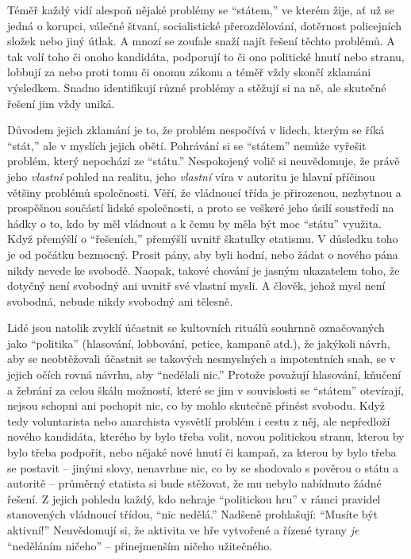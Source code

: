 \documentclass{book}
\begin{document}
Téměř každý vidí alespoň nějaké problémy se \enquote{státem,} ve kterém žije, ať už se jedná o korupci, válečné štvaní, socialistické přerozdělování, dotěrnost policejních složek nebo jiný útlak. A mnozí se zoufale snaží najít řešení těchto problémů. A tak volí toho či onoho kandidáta, podporují to či ono politické hnutí nebo stranu, lobbují za nebo proti tomu či onomu zákonu a téměř vždy skončí zklamáni výsledkem. Snadno identifikují různé problémy a stěžují si na ně, ale skutečné řešení jim vždy uniká.

Důvodem jejich zklamání je to, že problém nespočívá v lidech, kterým se říká \enquote{stát,} ale v myslích jejich obětí. Pohrávání si se \enquote{státem} nemůže vyřešit problém, který nepochází ze \enquote{státu.} Nespokojený volič si neuvědomuje, že právě jeho \emph{vlastní} pohled na realitu, jeho \emph{vlastní} víra v autoritu je hlavní příčinou většiny problémů společnosti. Věří, že vládnoucí třída je přirozenou, nezbytnou a prospěšnou součástí lidské společnosti, a proto se veškeré jeho úsilí soustředí na hádky o to, kdo by měl vládnout a k čemu by měla být moc \enquote{státu} využita. Když přemýšlí o \enquote{řešeních,} přemýšlí uvnitř škatulky etatismu. V důsledku toho je od počátku bezmocný. Prosit pány, aby byli hodní, nebo žádat o nového pána nikdy nevede ke svobodě. Naopak, takové chování je jasným ukazatelem toho, že dotyčný není svobodný ani uvnitř své vlastní mysli. A člověk, jehož mysl není svobodná, nebude nikdy svobodný ani tělesně.

Lidé jsou natolik zvyklí účastnit se kultovních rituálů souhrnně označovaných jako \enquote{politika} (hlasování, lobbování, petice, kampaně atd.), že jakýkoli návrh, aby se neobtěžovali účastnit se takových nesmyslných a impotentních snah, se v jejich očích rovná návrhu, aby \enquote{nedělali nic.} Protože považují hlasování, kňučení a žebrání za celou škálu možností, které se jim v souvislosti se \enquote{státem} otevírají, nejsou schopni ani pochopit nic, co by mohlo skutečně přinést svobodu. Když tedy voluntarista nebo anarchista vysvětlí problém i cestu z něj, ale nepředloží nového kandidáta, kterého by bylo třeba volit, novou politickou stranu, kterou by bylo třeba podpořit, nebo nějaké nové hnutí či kampaň, za kterou by bylo třeba se postavit -- jinými slovy, nenavrhne nic, co by se shodovalo s pověrou o státu a autoritě -- průměrný etatista si bude stěžovat, že mu nebylo nabídnuto žádné řešení. Z jejich pohledu každý, kdo nehraje \enquote{politickou hru} v rámci pravidel stanovených vládnoucí třídou, \enquote{nic nedělá.} Nadšeně prohlašují: \enquote{Musíte být aktivní!} Neuvědomují si, že aktivita ve hře vytvořené a řízené tyrany \emph{je} \enquote{neděláním ničeho} -- přinejmenším ničeho užitečného.
\end{document}
